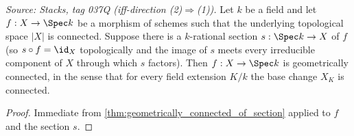 \begin{lemma}\leanok
  \label{lem:geometricallyConnected_of_connected_of_section}
  \textit{Source: Stacks, tag 037Q (iff-direction (2)\(\Rightarrow\)(1)).}
  Let \(k\) be a field and let \(f : X \to \Spec k\) be a morphism of
  schemes such that the underlying topological space \(|X|\) is
  connected. Suppose there is a \(k\)-rational section \(s : \Spec k \to X\)
  of \(f\) (so \(s \circ f = \id_X\) topologically and the image of \(s\)
  meets every irreducible component of \(X\) through which \(s\) factors).
  Then \(f : X \to \Spec k\) is geometrically connected, in the sense
  that for every field extension \(K/k\) the base change \(X_K\) is
  connected.
\end{lemma}
\begin{proof}
  \leanok
  Immediate from \cref{thm:geometrically_connected_of_section} applied
  to \(f\) and the section \(s\).
\end{proof}

